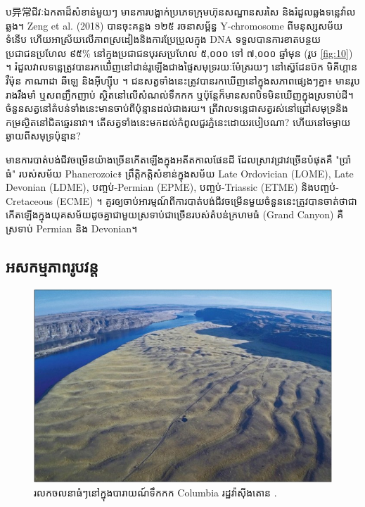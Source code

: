 \documentclass[10pt,twocolumn,letterpaper]{article}
\begin{document}
ប异常ជីវៈឯកតាដ៏សំខាន់មួយៗ មានការបង្អាក់ប្រភេទក្រុមហ៊ុនសណ្ឋានសរសៃ និងរំដួលឆ្លងទន្លេវ៉ាលឆ្លង។ Zeng et al. (2018) បានចុះគន្លង ១២៥ រចនាសម្ព័ន្ធ Y-chromosome ពីមនុស្សសម័យទំនើប ហើយអាស្រ័យលើភាពស្រដៀងនិងការប្រែប្រួលក្នុង DNA ទទួលបានការខាតបន្ថយប្រជាជនប្រហែល ៩៥\% នៅក្នុងប្រជាជនបុរសប្រហែល ៥,០០០ ទៅ ៧,០០០ ឆ្នាំមុន (រូប \ref{fig:10}) \cite{62}។ រំដួលវាលទន្លេត្រូវបានរកឃើញនៅជាន់រូឡើងជាងផ្ទៃសមុទ្ររយៈម៉ែត្ររយៗ នៅស៊្វេដែនប៊ក មិគីហ្គាន វឺម៉ុន កាណាដា ឆីឡេ និងអ៊ីហ្ស៊ីប \cite{63,64,65,66}។ ជនសត្វទាំងនេះត្រូវបានរកឃើញនៅក្នុងសភាពផ្សេងៗគ្នា៖ មានរូបរាងរឹងមាំ ឬសពញឹកញាប់ ស្ថិតនៅលើសំណល់ទឹកកក ឬប៉ុន្តែក៏មានសពបិទមិនឃើញក្នុងស្រទាប់ដី។ ចំនួនសត្វនៅតំបន់ទាំងនេះមានចាប់ពីប៉ុន្មានដល់ជាងរយ។ ត្រីវាលទន្លេជាសត្វរស់នៅជ្រៅសមុទ្រនិងកម្រស្ថិតនៅជិតឆ្នេរនាវា។ តើសត្វទាំងនេះមកដល់កំពូលជួរភ្នំនេះដោយរបៀបណា? ហើយនៅចម្ងាយឆ្ងាយពីសមុទ្រប៉ុន្មាន?

មានការបាត់បង់ជីវចម្រើនយ៉ាងច្រើនកើតឡើងក្នុងអតីតកាលផែនដី ដែលស្រាវជ្រាវច្រើនបំផុតគឺ "ប្រាំធំ" របស់សម័យ Phanerozoic៖ ព្រឹត្តិកត្តិសំខាន់ក្នុងសម័យ Late Ordovician (LOME), Late Devonian (LDME), បញ្ចប់-Permian (EPME), បញ្ចប់-Triassic (ETME) និងបញ្ចប់-Cretaceous (ECME) \cite{88,89}។ គួរឲ្យចាប់អារម្មណ៍ពីការបាត់បង់ជីវចម្រើនមួយចំនួននេះត្រូវបានចាត់ថាជាកើតឡើងក្នុងយុគសម័យដូចគ្នាជាមួយស្រទាប់ជាច្រើនរបស់តំបន់ក្រហមធំ (Grand Canyon) គឺស្រទាប់ Permian និង Devonian។

\subsection{អសកម្មភាពរូបវន្ត}

\begin{figure}[b]
\begin{center}
   \includegraphics[width=1\linewidth]{columbia.jpg}
\end{center}
   \caption{រលកចលនា​ធំៗ​នៅក្នុង​បារាយណ៍​ទឹកកក Columbia រដ្ឋវ៉ាស៊ីងតោន \cite{80}.}
\label{fig:11}
\label{fig:onecol}
\end{figure}
\end{document}
